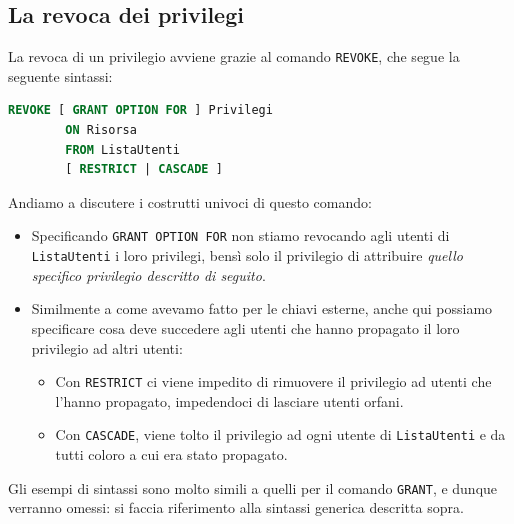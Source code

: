 \documentclass[12pt]{report}
\begin{document}
	\subsection{La revoca dei privilegi}
	La revoca di un privilegio avviene grazie al comando \texttt{REVOKE}, che segue la seguente sintassi:
	\begin{lstlisting}[language=SQL]
		REVOKE [ GRANT OPTION FOR ] Privilegi
		ON Risorsa
		FROM ListaUtenti
		[ RESTRICT | CASCADE ]
	\end{lstlisting}
	Andiamo a discutere i costrutti univoci di questo comando:
	\begin{itemize}
		\item Specificando \texttt{GRANT OPTION FOR} non stiamo revocando agli utenti di \texttt{ListaUtenti} i loro privilegi, bensì solo il privilegio di attribuire \textit{quello specifico privilegio descritto di seguito}.
		
		\item Similmente a come avevamo fatto per le chiavi esterne, anche qui possiamo specificare cosa deve succedere agli utenti che hanno propagato il loro privilegio ad altri utenti:
		\begin{itemize}
			\item Con \texttt{RESTRICT} ci viene impedito di rimuovere il privilegio ad utenti che l'hanno propagato, impedendoci di lasciare utenti orfani.
			
			\item Con \texttt{CASCADE}, viene tolto il privilegio ad ogni utente di \texttt{ListaUtenti} e da tutti coloro a cui era stato propagato.
		\end{itemize}
	\end{itemize}
	
	Gli esempi di sintassi sono molto simili a quelli per il comando \texttt{GRANT}, e dunque verranno omessi: si faccia riferimento alla sintassi generica descritta sopra.
	
\end{document}
